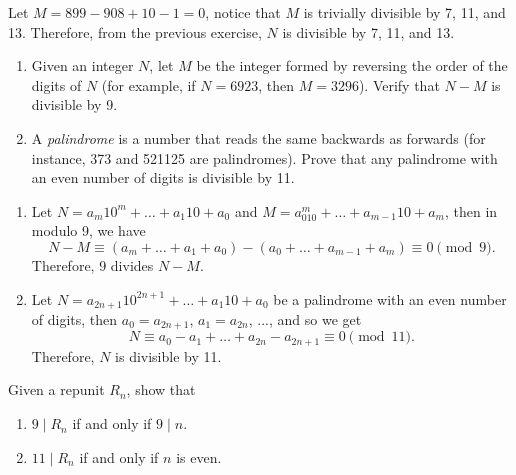 \begin{solution}
    Let $M = 899 - 908 + 10 - 1 = 0$, notice that $M$ is trivially divisible by 7, 11, and 13. Therefore, from the previous exercise, $N$ is divisible by 7, 11, and 13. \\
\end{solution}

\begin{exercise}
    \begin{enumerate}
        \item Given an integer $N$, let $M$ be the integer formed by reversing the order of the digits of $N$ (for example, if $N = 6923$, then $M = 3296$). Verify that $N - M$ is divisible by 9.
        \item A \textit{palindrome} is a number that reads the same backwards as forwards (for instance, 373 and 521125 are palindromes). Prove that any palindrome with an even number of digits is divisible by 11.
    \end{enumerate}
\end{exercise}

\begin{solution}
    \begin{enumerate}
        \item Let $N = a_m10^m + \dots + a_1 10 + a_0$ and $M = a_010^m + \dots + a_{m-1} 10 + a_m$, then in modulo 9, we have 
        $$N - M \equiv (a_m + \dots + a_1 + a_0) - (a_0 + \dots + a_{m-1} + a_m) \equiv 0 \pmod 9.$$
        Therefore, 9 divides $N - M$.
        \item Let $N = a_{2n+1}10^{2n+1} + \dots + a_1 10 + a_0$ be a palindrome with an even number of digits, then $a_0 = a_{2n+1}$, $a_1 = a_{2n}$, ..., and so we get 
        $$N \equiv a_0 - a_1 + \dots + a_{2n} - a_{2n+1} \equiv 0 \pmod{11}.$$
        Therefore, $N$ is divisible by 11. \\
    \end{enumerate}
\end{solution}

\begin{exercise}
    Given a repunit $R_n$, show that
    \begin{enumerate}
        \item $9 \mid R_n$ if and only if $9 \mid n$.
        \item $11 \mid R_n$ if and only if $n$ is even.
    \end{enumerate}
\end{exercise}

